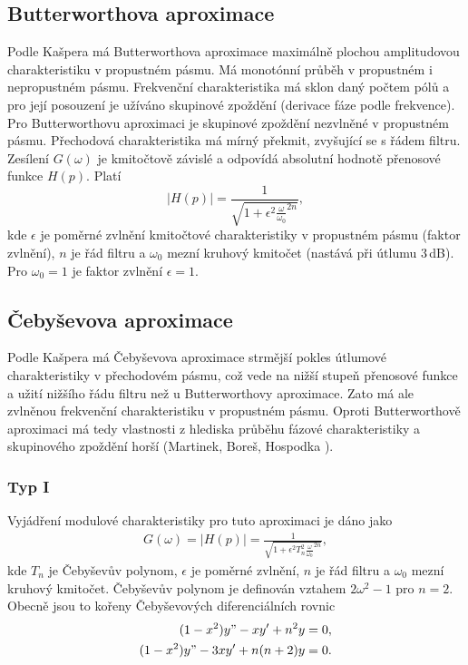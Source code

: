 \subsection{Butterworthova aproximace}
Podle Kašpera \cite{7} má Butterworthova aproximace maximálně plochou amplitudovou charakteristiku v propustném pásmu. Má monotónní průběh v propustném i nepropustném pásmu. Frekvenční charakteristika má sklon daný počtem pólů a pro její posouzení je užíváno skupinové zpoždění (derivace fáze podle frekvence). Pro Butterworthovu aproximaci je skupinové zpoždění nezvlněné v propustném pásmu. Přechodová charakteristika má mírný překmit, zvyšující se s řádem filtru. Zesílení $G(\omega)$ je kmitočtově závislé a odpovídá absolutní hodnotě přenosové funkce $H(p)$. Platí
\begin{equation}
|H(p)| = \frac{1}{\sqrt{1 + \epsilon ^2 \frac{\omega}{\omega _0}^{2n}}},
\end{equation}
kde $\epsilon$ je poměrné zvlnění kmitočtové charakteristiky v propustném pásmu (faktor zvlnění), $n$ je řád filtru a $\omega _0$ mezní kruhový kmitočet (nastává při útlumu 3\,dB). Pro $\omega _0 = 1$ je faktor zvlnění $\epsilon = 1$. 
\subsection{Čebyševova aproximace}
Podle Kašpera \cite{7} má Čebyševova aproximace strmější pokles útlumové charakteristiky v přechodovém pásmu, což vede na nižší stupeň přenosové funkce a užití nižšího řádu filtru než u Butterworthovy aproximace. Zato má ale zvlněnou frekvenční charakteristiku v propustném pásmu. Oproti Butterworthově aproximaci má tedy vlastnosti z hlediska průběhu fázové charakteristiky a skupinového zpoždění horší (Martinek, Boreš, Hospodka \cite{12}).
\subsubsection{Typ I}
Vyjádření modulové charakteristiky pro tuto aproximaci je dáno jako
\begin{align}
G(\omega) = |H(p)| = \frac{1}{\sqrt{1 + \epsilon ^2 T_n ^2 \frac{\omega}{\omega _0}^{2n}}},
\end{align}
kde $T_n$ je Čebyševův polynom, $\epsilon$ je poměrné zvlnění, $n$ je řád filtru a $\omega _0$ mezní kruhový kmitočet. Čebyševův polynom je definován vztahem $2 \omega ^2 - 1$ pro $n = 2$. Obecně jsou to kořeny Čebyševových diferenciálních rovnic
\begin{align}
(1 - x^2)y" - xy' + n^2y &= 0,\\
(1 - x^2)y" - 3xy' + n(n+2)y &= 0.
\end{align}
